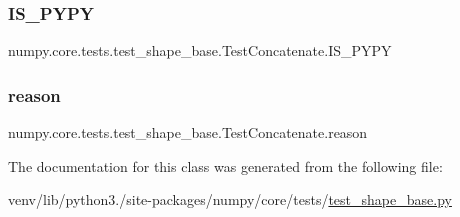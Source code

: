 \subsubsection{\texorpdfstring{I\+S\+\_\+\+P\+Y\+PY}{IS\_PYPY}}
{\footnotesize\ttfamily numpy.\+core.\+tests.\+test\+\_\+shape\+\_\+base.\+Test\+Concatenate.\+I\+S\+\_\+\+P\+Y\+PY\hspace{0.3cm}{\ttfamily [static]}}

\mbox{\label{classnumpy_1_1core_1_1tests_1_1test__shape__base_1_1TestConcatenate_a4b438a8e437fde8a495433f27ae6287d}} 
\subsubsection{\texorpdfstring{reason}{reason}}
{\footnotesize\ttfamily numpy.\+core.\+tests.\+test\+\_\+shape\+\_\+base.\+Test\+Concatenate.\+reason\hspace{0.3cm}{\ttfamily [static]}}



The documentation for this class was generated from the following file\+:\begin{DoxyCompactItemize}
\item 
venv/lib/python3./site-\/packages/numpy/core/tests/\hyperlink{core_2tests_2test__shape__base_8py}{test\+\_\+shape\+\_\+base.\+py}\end{DoxyCompactItemize}
